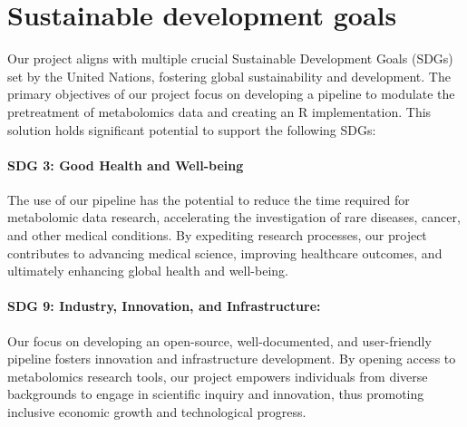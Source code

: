 \documentclass[ENG, BIB]{TFUOC}%
\begin{document}


\chapter{Sustainable development goals}
\label{s:etic}

 Our project aligns with multiple crucial Sustainable Development Goals (SDGs) set by the United Nations, fostering global sustainability and development. The primary objectives of our project focus on developing a pipeline to modulate the pretreatment of metabolomics data and creating an R implementation. This solution holds significant potential to support the following SDGs:  
 
\subsubsection{SDG 3: Good Health and Well-being} 
 
The use of our pipeline has the potential to reduce the time required for metabolomic data research, accelerating the investigation of rare diseases, cancer, and other medical conditions. By expediting research processes, our project contributes to advancing medical science, improving healthcare outcomes, and ultimately enhancing global health and well-being.
 
\subsubsection{SDG 9: Industry, Innovation, and Infrastructure:} 
 
Our focus on developing an open-source, well-documented, and user-friendly pipeline fosters innovation and infrastructure development. By opening access to metabolomics research tools, our project empowers individuals from diverse backgrounds to engage in scientific inquiry and innovation, thus promoting inclusive economic growth and technological progress.
 
\end{document}
